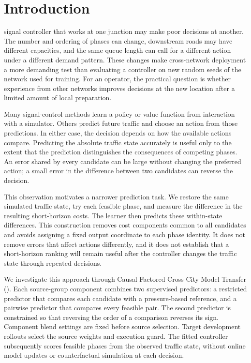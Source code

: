 \section{Introduction}
 signal controller that works at one junction may make poor decisions at another. The number and ordering of phases can change, downstream roads may have different capacities, and the same queue length can call for a different action under a different demand pattern. These changes make cross-network deployment a more demanding test than evaluating a controller on new random seeds of the network used for training. For an operator, the practical question is whether experience from other networks improves decisions at the new location after a limited amount of local preparation.

Many signal-control methods learn a policy or value function from interaction with a simulator. Others predict future traffic and choose an action from those predictions. In either case, the decision depends on how the available actions compare. Predicting the absolute traffic state accurately is useful only to the extent that the prediction distinguishes the consequences of competing phases. An error shared by every candidate can be large without changing the preferred action; a small error in the difference between two candidates can reverse the decision.

This observation motivates a narrower prediction task. We restore the same simulated traffic state, try each feasible phase, and measure the difference in the resulting short-horizon costs. The learner then predicts these within-state differences. This construction removes cost components common to all candidates and avoids assigning a fixed output coordinate to each phase identity. It does not remove errors that affect actions differently, and it does not establish that a short-horizon ranking will remain useful after the controller changes the traffic state through repeated decisions.

We investigate this approach through Causal-Factored Cross-City Model Transfer (\method). Each source-group component combines two supervised predictors: a restricted predictor that compares each candidate with a pressure-based reference, and a pairwise predictor that compares every feasible pair. The second predictor is constrained so that reversing the order of a comparison reverses its sign. Component blend settings are fixed before source selection. Target development rollouts select the source weights and execution guard. The fitted controller subsequently scores feasible phases from the observed traffic state, without online model updates or counterfactual simulation at each decision.


